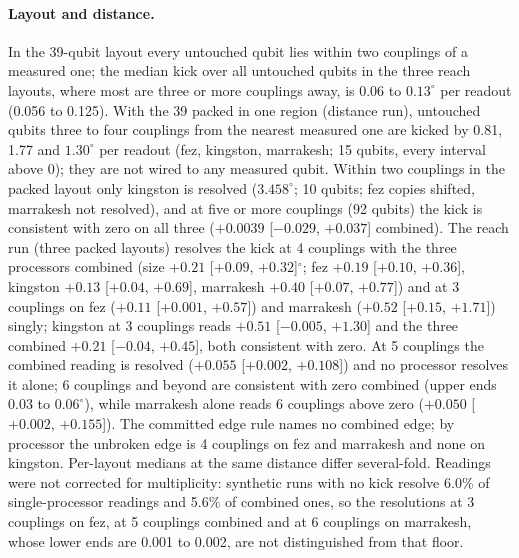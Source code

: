 \documentclass[reprint,amsmath,amssymb,aps,superscriptaddress,nofootinbib]{revtex4-2}
\begin{document}
\paragraph*{Layout and distance.} In the 39-qubit layout every untouched qubit lies within two couplings of a measured one; the median kick over all untouched qubits in the three reach layouts, where most are three or more couplings away, is 0.06 to $0.13^\circ$ per readout (0.056 to 0.125). With the 39 packed in one region (distance run), untouched qubits three to four couplings from the nearest measured one are kicked by 0.81, 1.77 and $1.30^\circ$ per readout (fez, kingston, marrakesh; 15 qubits, every interval above 0); they are not wired to any measured qubit. Within two couplings in the packed layout only kingston is resolved ($3.458^\circ$; 10 qubits; fez copies shifted, marrakesh not resolved), and at five or more couplings (92 qubits) the kick is consistent with zero on all three ($+0.0039$ [$-0.029$, $+0.037$] combined). The reach run (three packed layouts) resolves the kick at 4 couplings with the three processors combined (size $+0.21$ [$+0.09$, $+0.32$]$^\circ$; fez $+0.19$ [$+0.10$, $+0.36$], kingston $+0.13$ [$+0.04$, $+0.69$], marrakesh $+0.40$ [$+0.07$, $+0.77$]) and at 3 couplings on fez ($+0.11$ [$+0.001$, $+0.57$]) and marrakesh ($+0.52$ [$+0.15$, $+1.71$]) singly; kingston at 3 couplings reads $+0.51$ [$-0.005$, $+1.30$] and the three combined $+0.21$ [$-0.04$, $+0.45$], both consistent with zero. At 5 couplings the combined reading is resolved ($+0.055$ [$+0.002$, $+0.108$]) and no processor resolves it alone; 6 couplings and beyond are consistent with zero combined (upper ends 0.03 to $0.06^\circ$), while marrakesh alone reads 6 couplings above zero ($+0.050$ [$+0.002$, $+0.155$]). The committed edge rule names no combined edge; by processor the unbroken edge is 4 couplings on fez and marrakesh and none on kingston. Per-layout medians at the same distance differ several-fold. Readings were not corrected for multiplicity: synthetic runs with no kick resolve 6.0\% of single-processor readings and 5.6\% of combined ones, so the resolutions at 3 couplings on fez, at 5 couplings combined and at 6 couplings on marrakesh, whose lower ends are 0.001 to 0.002, are not distinguished from that floor.
\end{document}

